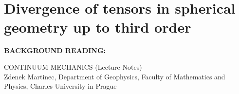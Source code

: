 \documentclass[10pt,paper=a4]{report}
\newcommand{\eht}{\overline}
\newcommand{\fht}{\widetilde}
\begin{document}





\newpage

\section{Divergence of tensors in spherical geometry up to third order}

\noindent
{\bf{BACKGROUND READING:}} \\

\vspace{0.3cm}

\noindent
CONTINUUM MECHANICS (Lecture Notes) \\
Zdenek Martinec, Department of Geophysics, Faculty of Mathematics and Physics, Charles University in Prague 



\end{document}
